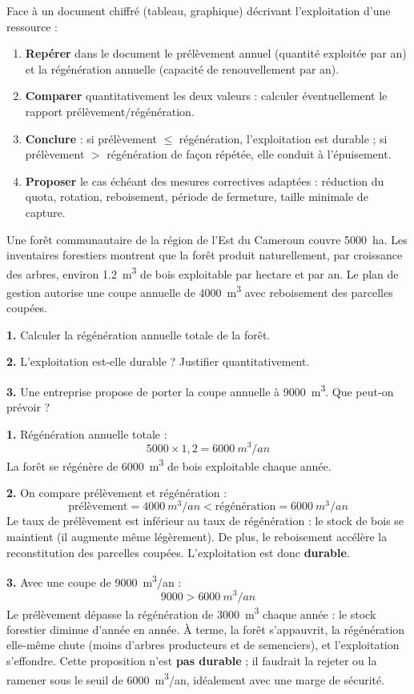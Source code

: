 \documentclass[11pt]{article}
\begin{document}
\begin{methode}
Face à un document chiffré (tableau, graphique) décrivant l'exploitation d'une ressource :
\begin{enumerate}
\item \textbf{Repérer} dans le document le prélèvement annuel (quantité exploitée par an) et la régénération annuelle (capacité de renouvellement par an).
\item \textbf{Comparer} quantitativement les deux valeurs : calculer éventuellement le rapport prélèvement/régénération.
\item \textbf{Conclure} : si prélèvement $\leq$ régénération, l'exploitation est durable ; si prélèvement $>$ régénération de façon répétée, elle conduit à l'épuisement.
\item \textbf{Proposer} le cas échéant des mesures correctives adaptées : réduction du quota, rotation, reboisement, période de fermeture, taille minimale de capture.
\end{enumerate}
\end{methode}

\begin{exoresolu}
Une forêt communautaire de la région de l'Est du Cameroun couvre \SI{5000}{ha}. Les inventaires forestiers montrent que la forêt produit naturellement, par croissance des arbres, environ \SI{1,2}{m^3} de bois exploitable par hectare et par an. Le plan de gestion autorise une coupe annuelle de \SI{4000}{m^3} avec reboisement des parcelles coupées.

\textbf{1.} Calculer la régénération annuelle totale de la forêt.

\textbf{2.} L'exploitation est-elle durable ? Justifier quantitativement.

\textbf{3.} Une entreprise propose de porter la coupe annuelle à \SI{9000}{m^3}. Que peut-on prévoir ?

\tcblower

\textbf{1.} Régénération annuelle totale :
\[ 5000 \times 1,2 = 6000 \ \si{m^3/an} \]
La forêt se régénère de \SI{6000}{m^3} de bois exploitable chaque année.

\textbf{2.} On compare prélèvement et régénération :
\[ \text{prélèvement} = 4000 \ \si{m^3/an} < \text{régénération} = 6000 \ \si{m^3/an} \]
Le taux de prélèvement est inférieur au taux de régénération : le stock de bois se maintient (il augmente même légèrement). De plus, le reboisement accélère la reconstitution des parcelles coupées. L'exploitation est donc \textbf{durable}.

\textbf{3.} Avec une coupe de \SI{9000}{m^3/an} :
\[ 9000 > 6000 \ \si{m^3/an} \]
Le prélèvement dépasse la régénération de \SI{3000}{m^3} chaque année : le stock forestier diminue d'année en année. À terme, la forêt s'appauvrit, la régénération elle-même chute (moins d'arbres producteurs et de semenciers), et l'exploitation s'effondre. Cette proposition n'est \textbf{pas durable} ; il faudrait la rejeter ou la ramener sous le seuil de \SI{6000}{m^3/an}, idéalement avec une marge de sécurité.
\end{exoresolu}
\end{document}
